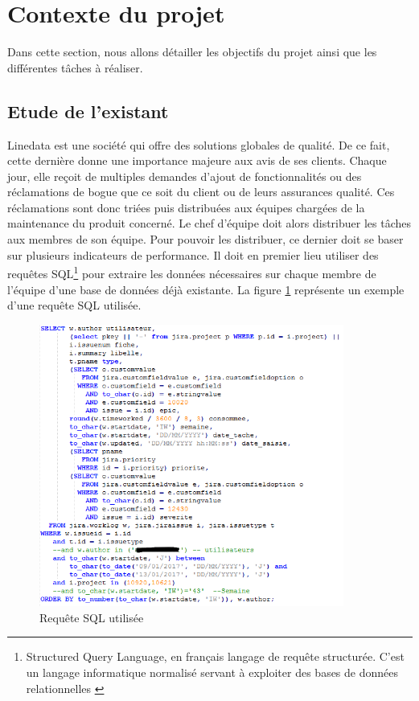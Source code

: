 \newpage
\section{Contexte du projet}
Dans cette section, nous allons détailler les objectifs du projet ainsi que les différentes tâches à réaliser.
\subsection{Etude de l'existant}
Linedata est une société qui offre des solutions globales de qualité. De ce fait, cette dernière donne une importance majeure aux avis de ses clients. Chaque jour, elle reçoit de multiples demandes d'ajout de fonctionnalités ou des réclamations de bogue que ce soit du client ou de leurs assurances qualité. Ces réclamations sont donc triées puis distribuées aux équipes chargées de la maintenance du produit concerné. Le chef d'équipe doit alors distribuer les tâches aux membres de son équipe. Pour pouvoir les distribuer, ce dernier doit se baser sur plusieurs indicateurs de performance. Il doit en premier lieu utiliser des requêtes SQL\footnote{Structured Query Language, en français langage de requête structurée.  C'est un langage informatique normalisé servant à exploiter des bases de données relationnelles \cite{SQL}} pour extraire les données nécessaires sur chaque membre de l'équipe d'une base de données déjà existante. La figure \ref{code4} représente un exemple d'une requête SQL utilisée.
\begin{figure}[H]
  \centering
  \includegraphics[scale=0.65,width=10cm]{figures/used_sql_request.png}
  \caption{Requête SQL utilisée}
  \label{code4}
\end{figure}
